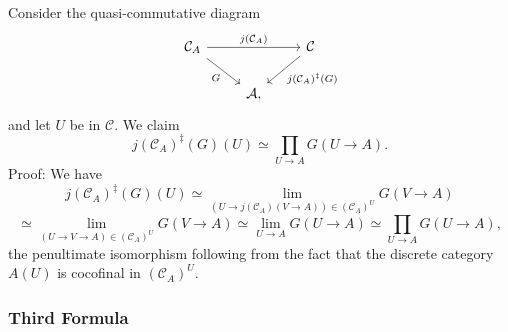 \documentclass[12pt]{article}%
\theoremstyle{remark}
\theoremstyle{definition}
\newcommand{\A}{\mathcal A}
\newcommand{\C}{\mathcal C}
\begin{document}
Consider the quasi-commutative diagram 
$$
\begin{tikzcd}
\C_A\ar{rr}{j(\C_A)}\ar{dr}[swap]{G}&&\C\ar{dl}{j(\C_A)^\ddagger(G)}\\ 
{}&\A,
\end{tikzcd}
$$ 
and let $U$ be in $\C$. We claim 
\begin{equation}\label{prepa2}
j(\C_A)^\ddagger(G)(U)\simeq\prod_{U\to A}G(U\to A).
\end{equation} 
Proof: We have 
$$
j(\C_A)^\ddagger(G)(U)\simeq\lim_{(U\to j(\C_A)(V\to A))\in(\C_A)^U}G(V\to A)
$$
$$
\simeq\lim_{(U\to V\to A)\in(\C_A)^U}G(V\to A)\simeq\lim_{U\to A}G(U\to A)\simeq\prod_{U\to A}G(U\to A),
$$
the penultimate isomorphism following from the fact that the discrete category $A(U)$ is cocofinal in $(\C_A)^U$. 

\subsubsection{Third Formula}
\end{document}
